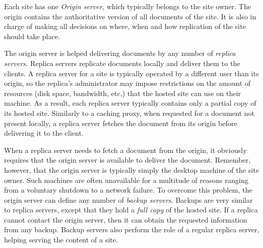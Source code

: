 \documentclass[10pt,a4paper]{article}
\makeatletter
\newenvironment{p}{\@open{P}{}}{\@close{P}}
\newenvironment{p}{}{\par}
\makeatother
\begin{document}
\begin{p}
\label{sec:intro:term:origin} Each site has one \emph{Origin server},
which typically belongs to the site owner. The origin contains the
authoritative version of all documents of the site. It is also in charge of
making all decisions on where, when and how replication of the site should
take place.
\end{p}

\begin{p}
\label{sec:intro:term:replica} The origin server is helped delivering 
documents by any number of \emph{replica servers}.  Replica servers replicate
documents locally and deliver them to the clients. A replica server for a site
is typically operated by a different user than its origin, so the replica's
administrator may impose restrictions on the amount of resources (disk space,
bandwidth, etc,) that the hosted site can use on their machine.  As a result,
each replica server typically contains only a partial copy of its hosted
site. Similarly to a caching proxy, when requested for a document not present
locally, a replica server fetches the document from its origin before
delivering it to the client.
\end{p}

\begin{p}
\label{sec:intro:term:backup} When a replica server needs to fetch a
document from the origin, it obviously requires that the origin server is
available to deliver the document.  Remember, however, that the origin server
is typically simply the desktop machine of the site owner. Such machines are
often unavailable for a multitude of reasons ranging from a voluntary shutdown
to a network failure. To overcome this problem, the origin server can define
any number of \emph{backup servers}.  Backups are very similar to replica
servers, except that they hold a \emph{full copy} of the hosted site.  If a
replica cannot contact the origin server, then it can obtain the requested
information from any backup.  Backup servers also perform the role of a
regular replica server, helping serving the content of a site.
\end{p}
\end{document}
